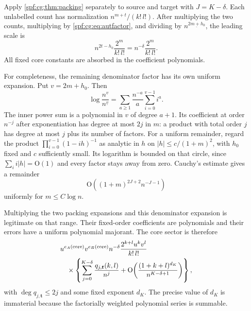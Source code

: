 \documentclass[11pt]{article}
\numberwithin{equation}{section}
\theoremstyle{definition}
\theoremstyle{remark}
\theoremstyle{definition}
\newcommand{\fall}[2]{{#1}^{\underline{#2}}}
\newcommand{\bigO}{\mathrm O}
\begin{document}
Apply \cref{spf:cg:thm:packing} separately to source and target with
$J=K-\delta$. Each unlabelled count has normalization $n^{m+t}/(k!\,l!)$.
After multiplying the two counts, multiplying by \eqref{spf:cg:eq:autfactor},
and dividing by $\fall n{2m+h_0}$, the leading scale is
\begin{equation}
 n^{2t-h_0}\frac{2^m}{k!\,l!}
       =n^{-\delta}\frac{2^m}{k!\,l!}.
 \label{spf:cg:eq:normalization}
\end{equation}
All fixed core constants are absorbed in the coefficient polynomials.

For completeness, the remaining denominator factor has its own uniform
expansion. Put $v=2m+h_0$. Then
\begin{equation}
 \log\frac{n^v}{\fall nv}
       =\sum_{a\ge1}\frac{n^{-a}}a\sum_{i=0}^{v-1}i^a.
 \label{spf:cg:eq:denlog}
\end{equation}
The inner power sum is a polynomial in $v$ of degree $a+1$. Its coefficient
at order $n^{-j}$ after exponentiation has degree at most $2j$ in $m$:
a product with total order $j$ has degree at most $j$ plus its number of
factors. For a uniform remainder, regard the product
$\prod_{i=0}^{v-1}(1-ih)^{-1}$ as analytic in $h$ on $|h|\le c/(1+m)^2$, with
$h_0$ fixed and $c$ sufficiently small. Its logarithm is bounded on that
circle, since $\sum_ii|h|=\bigO(1)$ and every factor stays away from zero.
Cauchy's estimate gives a remainder
\begin{equation}
 \bigO\!\left((1+m)^{2J+2}n^{-J-1}\right)
 \label{spf:cg:eq:denrem}
\end{equation}
uniformly for $m\le C\log n$.

Multiplying the two packing expansions and this denominator expansion is
legitimate on that range. Their fixed-order coefficients are polynomials
and their errors have a uniform polynomial majorant. The core sector is
therefore
\begin{equation}
 \begin{split}
 &u^{e_A({\rm core})}v^{e_B({\rm core})}n^{-\delta}
 \frac{2^{k+l}u^kv^l}{k!\,l!}\\
 &\quad\times\left\{\sum_{j=0}^{K-\delta}
 \frac{q_{j,\boldsymbol t}(k,l)}{n^j}
 +\bigO\!\left(\frac{(1+k+l)^{d_K}}{n^{K-\delta+1}}\right)\right\},
 \end{split}
 \label{spf:cg:eq:coresector}
\end{equation}
with $\deg q_{j,\boldsymbol t}\le2j$ and some fixed exponent $d_K$. The
precise value of $d_K$ is immaterial because the factorially weighted
polynomial series is summable.
\end{document}
